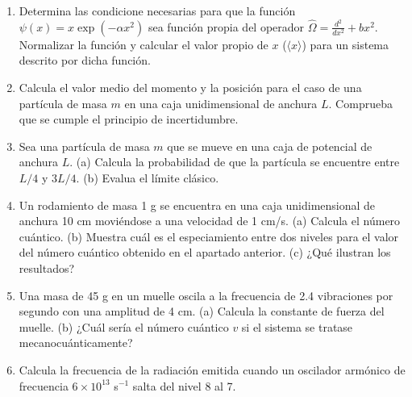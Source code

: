 \documentclass[a4paper, 11pt]{article}
\begin{document}
\begin{enumerate}
   \item Determina las condicione necesarias
   para que la función $\psi(x)=x\exp(-\alpha
   x^2)$ sea función propia del operador 
   $\hat{\Omega}=\frac{d^2}{dx^2} + bx^2$.
   Normalizar la función y calcular el valor 
   propio de $x$ ($\langle x\rangle$) para un
   sistema descrito por dicha función.
   
   \item Calcula el valor medio del momento y
   la posición para el caso de una partícula de
   masa $m$ en una caja unidimensional de anchura
   $L$. Comprueba que se cumple el principio de
   incertidumbre.
   
   \item Sea una partícula de masa $m$ que se
   mueve en una caja de potencial de anchura $L$.
   (a) Calcula la probabilidad de que la partícula
   se encuentre entre $L/4$ y $3L/4$. (b) Evalua el
   límite clásico.
   
  \item Un rodamiento de masa 1 g se encuentra
  en una caja unidimensional de anchura 10 cm
  moviéndose a una velocidad de 1 cm/s. (a) Calcula
  el número cuántico. (b) Muestra cuál es el especiamiento
  entre dos niveles para el valor del número cuántico 
  obtenido en el apartado anterior. (c) ¿Qué ilustran los 
  resultados?
  
  \item Una masa de 45 g en un muelle oscila a la 
  frecuencia de 2.4 vibraciones por segundo con 
  una amplitud de 4 cm. (a) Calcula la constante 
  de fuerza del muelle. (b) ¿Cuál sería el número
  cuántico $v$ si el sistema se tratase 
  mecanocuánticamente?
  
  \item Calcula la frecuencia de la radiación emitida
  cuando un oscilador armónico de frecuencia $6\times 10^{13}$
  s$^{-1}$ salta del nivel 8 al 7.
\end{enumerate}
\end{document}
